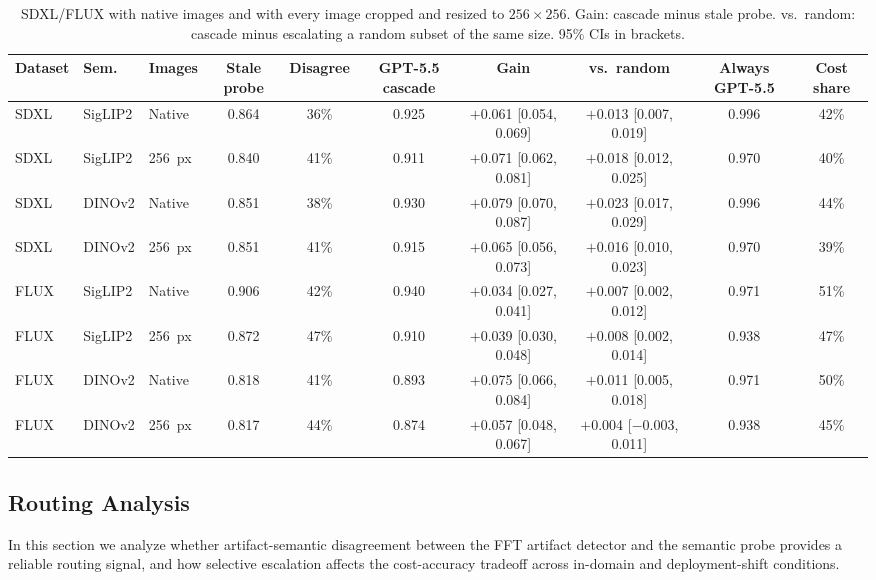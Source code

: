 \documentclass{ieeeaccess}
\begin{document}
\begin{table}[t]
\centering
\footnotesize
\setlength{\tabcolsep}{3pt}
\caption{SDXL/FLUX with native images and with every image cropped and resized to $256{\times}256$. Gain: cascade minus stale probe. vs.\ random: cascade minus escalating a random subset of the same size. 95\% CIs in brackets.}
\label{tab:sizematched}
\begin{tabular}{lllccccccc}
\toprule
Dataset & Sem. & Images & Stale probe & Disagree & GPT-5.5 cascade & Gain & vs.\ random & Always GPT-5.5 & Cost share \\
\midrule
SDXL & SigLIP2 & Native & 0.864 & 36\% & 0.925 & $+$0.061 [0.054, 0.069] & $+$0.013 [0.007, 0.019] & 0.996 & 42\% \\
SDXL & SigLIP2 & 256~px & 0.840 & 41\% & 0.911 & $+$0.071 [0.062, 0.081] & $+$0.018 [0.012, 0.025] & 0.970 & 40\% \\
\midrule
SDXL & DINOv2 & Native & 0.851 & 38\% & 0.930 & $+$0.079 [0.070, 0.087] & $+$0.023 [0.017, 0.029] & 0.996 & 44\% \\
SDXL & DINOv2 & 256~px & 0.851 & 41\% & 0.915 & $+$0.065 [0.056, 0.073] & $+$0.016 [0.010, 0.023] & 0.970 & 39\% \\
\midrule
FLUX & SigLIP2 & Native & 0.906 & 42\% & 0.940 & $+$0.034 [0.027, 0.041] & $+$0.007 [0.002, 0.012] & 0.971 & 51\% \\
FLUX & SigLIP2 & 256~px & 0.872 & 47\% & 0.910 & $+$0.039 [0.030, 0.048] & $+$0.008 [0.002, 0.014] & 0.938 & 47\% \\
\midrule
FLUX & DINOv2 & Native & 0.818 & 41\% & 0.893 & $+$0.075 [0.066, 0.084] & $+$0.011 [0.005, 0.018] & 0.971 & 50\% \\
FLUX & DINOv2 & 256~px & 0.817 & 44\% & 0.874 & $+$0.057 [0.048, 0.067] & $+$0.004 [$-$0.003, 0.011] & 0.938 & 45\% \\
\bottomrule
\end{tabular}
\end{table}

\subsection{Routing Analysis}
\label{sec:routing_analysis}

In this section we analyze whether artifact-semantic disagreement between the FFT artifact detector and
the semantic probe provides a reliable routing signal, and how selective escalation
affects the cost-accuracy tradeoff across in-domain and deployment-shift conditions.
\end{document}
